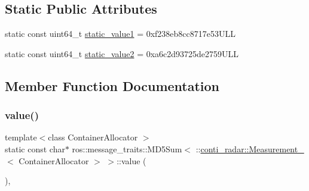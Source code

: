 \subsection*{Static Public Attributes}
\begin{DoxyCompactItemize}
\item 
static const uint64\+\_\+t \hyperlink{structros_1_1message__traits_1_1MD5Sum_3_01_1_1conti__radar_1_1Measurement___3_01ContainerAllocator_01_4_01_4_a5bd89b8a64ef68cac0305616a04892cf}{static\+\_\+value1} = 0xf238eb8cc8717e53\+U\+LL
\item 
static const uint64\+\_\+t \hyperlink{structros_1_1message__traits_1_1MD5Sum_3_01_1_1conti__radar_1_1Measurement___3_01ContainerAllocator_01_4_01_4_a7e1448dc7c16de9bf3444ba27d2d1e4d}{static\+\_\+value2} = 0xa6c2d93725de2759\+U\+LL
\end{DoxyCompactItemize}


\subsection{Member Function Documentation}
\mbox{\label{structros_1_1message__traits_1_1MD5Sum_3_01_1_1conti__radar_1_1Measurement___3_01ContainerAllocator_01_4_01_4_a2f4ad958d26adcc35db1efa902f4730a}} 
\subsubsection{\texorpdfstring{value()}{value()}\hspace{0.1cm}{\footnotesize\ttfamily [1/2]}}
{\footnotesize\ttfamily template$<$class Container\+Allocator $>$ \\
static const char$\ast$ ros\+::message\+\_\+traits\+::\+M\+D5\+Sum$<$ \+::\hyperlink{structconti__radar_1_1Measurement__}{conti\+\_\+radar\+::\+Measurement\+\_\+}$<$ Container\+Allocator $>$ $>$\+::value (\begin{DoxyParamCaption}{ }\end{DoxyParamCaption})\hspace{0.3cm}{\ttfamily [inline]}, {\ttfamily [static]}}

